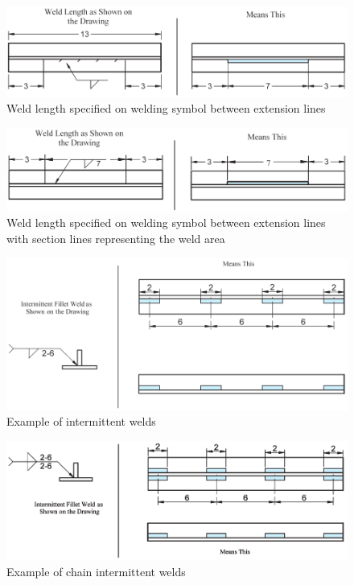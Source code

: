 \begin{figure}[H]
\centering
\includegraphics[width=.99\textwidth]{PIC/CH07/EXAMPLE/WL}
\caption{Weld length specified on welding symbol between extension lines \citep{Corgan2017}}
\end{figure}
\begin{figure}[H]
\centering
\includegraphics[width=.99\textwidth]{PIC/CH07/EXAMPLE/WL2}
\caption{Weld length specified on welding symbol between extension lines with
section lines representing the weld area \citep{Corgan2017}}
\end{figure}
\begin{figure}[H]
\centering
\includegraphics[width=.99\textwidth]{PIC/CH07/EXAMPLE/IW}
\caption{Example of intermittent welds \citep{Corgan2017}}
\end{figure}
\begin{figure}[H]
\centering
\includegraphics[width=.99\textwidth]{PIC/CH07/EXAMPLE/IW1}
\caption{Example of chain intermittent welds \citep{Corgan2017}}
\end{figure}
